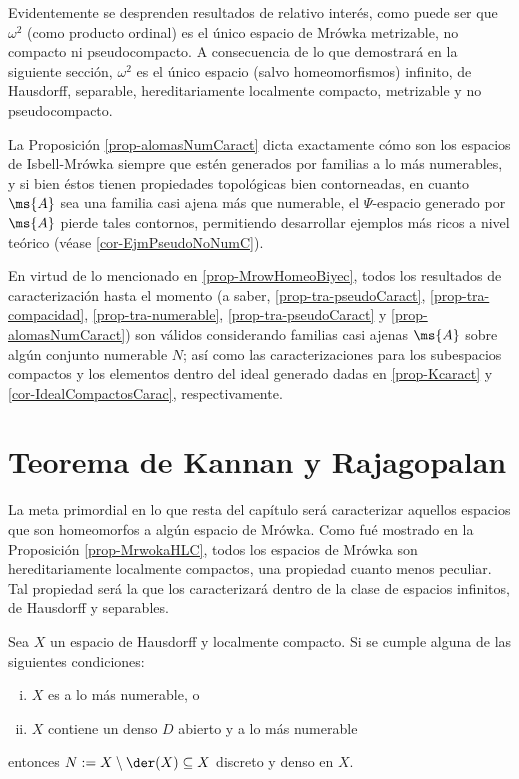 	Evidentemente se desprenden resultados de relativo interés, como puede ser que $\omega^2$ (como producto ordinal) es el único espacio de Mrówka metrizable, no compacto ni pseudocompacto. A consecuencia de lo que demostrará en la siguiente sección, $\omega^2$ es el único espacio (salvo homeomorfismos) infinito, de Hausdorff, separable, hereditariamente localmente compacto, metrizable y no pseudocompacto.
	
	La Proposición \ref{prop-alomasNumCaract} dicta exactamente cómo son los espacios de Isbell-Mrówka siempre que estén generados por familias a lo más numerables, y si bien éstos tienen propiedades topológicas bien contorneadas, en cuanto $\ms{A}$ sea una familia casi ajena más que numerable, el $\Psi$-espacio generado por $\ms{A}$ pierde tales contornos, permitiendo desarrollar ejemplos más ricos a nivel teórico (véase \ref{cor-EjmPseudoNoNumC}).
	
	\begin{observacion}
		En virtud de lo mencionado en \ref{prop-MrowHomeoBiyec}, todos los resultados de caracterización hasta el momento (a saber, \ref{prop-tra-pseudoCaract}, \ref{prop-tra-compacidad}, \ref{prop-tra-numerable}, \ref{prop-tra-pseudoCaract} y \ref{prop-alomasNumCaract}) son válidos considerando familias casi ajenas $\ms{A}$ sobre algún conjunto numerable $N$; así como las caracterizaciones para los subespacios compactos y los elementos dentro del ideal generado dadas en \ref{prop-Kcaract} y \ref{cor-IdealCompactosCarac}, respectivamente.
	\end{observacion}

	\section{Teorema de Kannan y Rajagopalan}
	
	La meta primordial en lo que resta del capítulo será caracterizar aquellos espacios que son homeomorfos a algún espacio de Mrówka. Como fué mostrado en la Proposición \ref{prop-MrwokaHLC}, todos los espacios de Mrówka son hereditariamente localmente compactos, una propiedad cuanto menos peculiar. Tal propiedad será la que los caracterizará dentro de la clase de espacios infinitos, de Hausdorff y separables.
	
	\begin{lema}\label{lem-TKR-Baire}
		Sea $X$ un espacio de Hausdorff y localmente compacto. Si se cumple alguna de las siguientes condiciones:
		\begin{enumerate}[i)]
			\item $X$ es a lo más numerable, o
			\item $X$ contiene un denso $D$ abierto y a lo más numerable
		\end{enumerate}	
		entonces $N:=X \setminus \der(X) \subseteq X$ discreto y denso en $X$.
	\end{lema}
	

